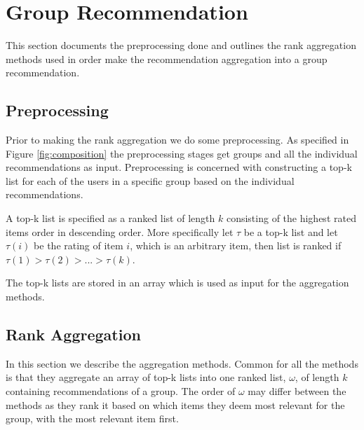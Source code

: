 \section{Group Recommendation}\label{sec:grouprecommendation}
This section documents the preprocessing done and outlines the rank aggregation methods used in order make the recommendation aggregation into a group recommendation. 

\subsection{Preprocessing}
Prior to making the rank aggregation we do some preprocessing. As specified in Figure \ref{fig:composition} the preprocessing stages get groups and all the individual recommendations as input. Preprocessing is concerned with constructing a top-k list for each of the users in a specific group based on the individual recommendations.

A top-k list is specified as a ranked list of length $k$ consisting of the highest rated items order in descending order. More specifically let $\tau$ be a top-k list and let $\tau(i)$ be the rating of item $i$, which is an arbitrary item, then list is ranked if $\tau (1) > \tau (2) > ... > \tau (k)$.

The top-k lists are stored in an array which is used as input for the aggregation methods.

\subsection{Rank Aggregation}\label{sec:aggregations}
In this section we describe the aggregation methods. Common for all the methods is that they aggregate an array of top-k lists into one ranked list, $\omega$, of length $k$ containing recommendations of a group. The order of $\omega$ may differ between the methods as they rank it based on which items they deem most relevant for the group, with the most relevant item first. 




